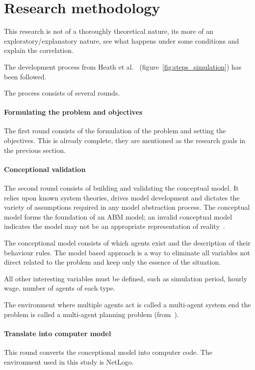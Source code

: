 \section{Research methodology}
This research is not of a thoroughly theoretical nature, its more of an exploratory/explanatory nature, see what happens under some conditions and explain the correlation.

The development process from Heath et al.~\cite{heath2009survey} (figure~\ref{fig:steps_simulation}) has been followed.

The process consists of several rounds.

\paragraph{Formulating the problem and objectives}
The first round consists of the formulation of the problem and setting the objectives.
This is already complete, they are mentioned as the research goals in the previous section.

\paragraph{Conceptional validation}
The second round consists of building and validating the conceptual model.
It relies upon known system theories, drives model development and dictates the variety of assumptions required in any model abstraction process.
The conceptual model forms the foundation of an ABM model; an invalid conceptual model indicates the model may not be an appropriate representation of reality~\cite{heath2009survey}.

The conceptional model consists of which agents exist and the description of their behaviour rules.
The model based approach is a way to eliminate all variables not direct related to the problem and keep only the essence of the situation.

All other interesting variables must be defined, such as simulation period, hourly wage, number of agents of each type.

The environment where multiple agents act is called a multi-agent system end the problem is called a multi-agent planning problem (from~\cite{russell2016artificial}).

\paragraph{Translate into computer model}
This round converts the conceptional model into computer code.
The environment used in this study is NetLogo.

